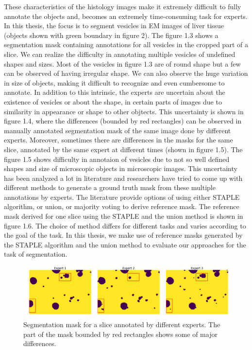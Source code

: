 These characteristics of the histology images make it extremely difficult to fully annotate the objects and, becomes an extremely time-consuming task for experts. In this thesis, the focus is to segment vesicles in EM images of liver tissue (objects shown with green boundary in figure 2). The figure 1.3 shows a segmentation mask containing annotations for all vesicles in the cropped part of a slice. We can realize the difficulty in annotating multiple vesicles of undefined shapes and sizes. Most of the vesicles in figure 1.3 are of round shape but a few can be observed of having irregular shape. We can also observe the huge variation in size of objects, making it difficult to recognize and even cumbersome to annotate. In addition to this intrinsic, the experts are uncertain about the existence of vesicles or about the shape, in certain parts of images due to similarity in appearance or shape to other objtects. This uncertainty is shown in figure 1.4, where the differences (bounded by red rectangles) can be observed in manually annotated segmentation mask of the same image done by different experts. Moreover, sometimes there are differences in the masks for the same slice, annotated by the same expert at different times (shown in figure 1.5). The figure 1.5 shows difficulty in annotaion of vesicles due to not so well defined shapes and size of microscopic objects in microscopic images. This uncertainty has been analyzed a lot in literature and researchers have tried to come up with different methods to generate a ground truth mask from these multiple annotations by experts. The literature provide options of using either STAPLE \cite{staple} algorithm, or union, or majority voting to derive reference mask. The reference mask derived for one slice using the STAPLE and the union method is shown in figure 1.6. The choice of method differs for different tasks and varies according to the goal of the task. In this thesis, we make use of reference masks generated by the STAPLE algorithm and the union method to evaluate our approaches for the task of segmentation.

\begin{figure}[h!] \label{fig:diffexperts}
 \includegraphics[width=1.0\linewidth]{figures/different_expert.pdf}
\caption{Segmentation mask for a slice annotated by different experts. The part of the mask bounded by red rectangles shows some of major differences.}
\end{figure}

